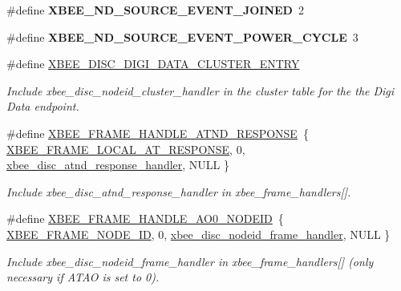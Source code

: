 \begin{DoxyCompactItemize}
\item 
\hypertarget{group__xbee__discovery_gad3637e6febeec639fd9750c40a6e7a7f}{\#define {\bfseries X\-B\-E\-E\-\_\-\-N\-D\-\_\-\-S\-O\-U\-R\-C\-E\-\_\-\-E\-V\-E\-N\-T\-\_\-\-J\-O\-I\-N\-E\-D}~2}\label{group__xbee__discovery_gad3637e6febeec639fd9750c40a6e7a7f}

\item 
\hypertarget{group__xbee__discovery_ga0e1a51031fe5f18aa5b2c5ad02bbb329}{\#define {\bfseries X\-B\-E\-E\-\_\-\-N\-D\-\_\-\-S\-O\-U\-R\-C\-E\-\_\-\-E\-V\-E\-N\-T\-\_\-\-P\-O\-W\-E\-R\-\_\-\-C\-Y\-C\-L\-E}~3}\label{group__xbee__discovery_ga0e1a51031fe5f18aa5b2c5ad02bbb329}

\item 
\#define \hyperlink{group__xbee__discovery_ga8f678e29b22812632df7d3fa3d0f951a}{X\-B\-E\-E\-\_\-\-D\-I\-S\-C\-\_\-\-D\-I\-G\-I\-\_\-\-D\-A\-T\-A\-\_\-\-C\-L\-U\-S\-T\-E\-R\-\_\-\-E\-N\-T\-R\-Y}
\begin{DoxyCompactList}\small\item\em Include xbee\-\_\-disc\-\_\-nodeid\-\_\-cluster\-\_\-handler in the cluster table for the the Digi Data endpoint. \end{DoxyCompactList}\item 
\hypertarget{group__xbee__discovery_gadfed4daf7748e615dedf036d94d9fee9}{\#define \hyperlink{group__xbee__discovery_gadfed4daf7748e615dedf036d94d9fee9}{X\-B\-E\-E\-\_\-\-F\-R\-A\-M\-E\-\_\-\-H\-A\-N\-D\-L\-E\-\_\-\-A\-T\-N\-D\-\_\-\-R\-E\-S\-P\-O\-N\-S\-E}~\{ \hyperlink{group__xbee__device_gga7753bbebaf00d6d64942f64b6ae9b7b9ae66771334070219cd098c8201936cf4a}{X\-B\-E\-E\-\_\-\-F\-R\-A\-M\-E\-\_\-\-L\-O\-C\-A\-L\-\_\-\-A\-T\-\_\-\-R\-E\-S\-P\-O\-N\-S\-E}, 0, \hyperlink{group__xbee__discovery_ga6d1190133ded980a4eeca2034508c8a5}{xbee\-\_\-disc\-\_\-atnd\-\_\-response\-\_\-handler}, N\-U\-L\-L \}}\label{group__xbee__discovery_gadfed4daf7748e615dedf036d94d9fee9}

\begin{DoxyCompactList}\small\item\em Include xbee\-\_\-disc\-\_\-atnd\-\_\-response\-\_\-handler in xbee\-\_\-frame\-\_\-handlers\mbox{[}\mbox{]}. \end{DoxyCompactList}\item 
\#define \hyperlink{group__xbee__discovery_ga11002dcf6525c8a0d1144215bebbc774}{X\-B\-E\-E\-\_\-\-F\-R\-A\-M\-E\-\_\-\-H\-A\-N\-D\-L\-E\-\_\-\-A\-O0\-\_\-\-N\-O\-D\-E\-I\-D}~\{ \hyperlink{group__xbee__device_gga7753bbebaf00d6d64942f64b6ae9b7b9a5b572839c3123f1059ec2ced643cf5d2}{X\-B\-E\-E\-\_\-\-F\-R\-A\-M\-E\-\_\-\-N\-O\-D\-E\-\_\-\-I\-D}, 0, \hyperlink{group__xbee__discovery_gac15854e05ef3f80d6ddae653065c0a40}{xbee\-\_\-disc\-\_\-nodeid\-\_\-frame\-\_\-handler}, N\-U\-L\-L \}
\begin{DoxyCompactList}\small\item\em Include xbee\-\_\-disc\-\_\-nodeid\-\_\-frame\-\_\-handler in xbee\-\_\-frame\-\_\-handlers\mbox{[}\mbox{]} (only necessary if A\-T\-A\-O is set to 0). \end{DoxyCompactList}\end{DoxyCompactItemize}
